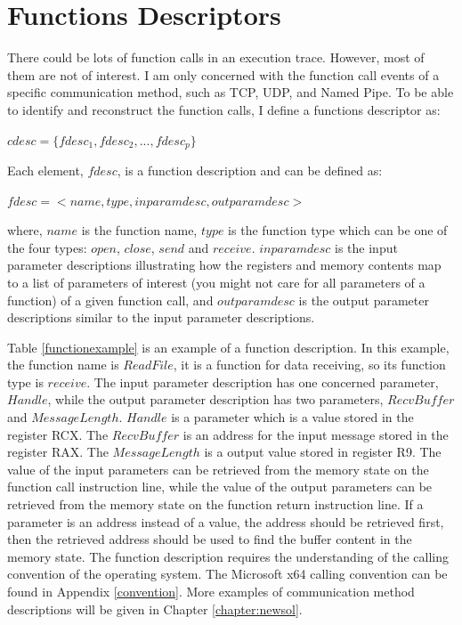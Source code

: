 \section{Functions Descriptors}\label{cdesc}
There could be lots of function calls in an execution trace. However, most of them are not of interest. I am only concerned with the function call events of a specific communication method, such as TCP, UDP, and Named Pipe. To be able to identify and reconstruct the function calls, I define a functions descriptor as:

$cdesc = \lbrace fdesc_1, fdesc_2,...,fdesc_p \rbrace$


Each element, $fdesc$, is a function description and can be defined as:

$fdesc = < name, type, inparamdesc, outparamdesc >$

where, $name$ is the function name, $type$ is the function type which can be one of the four types: $open$, $close$, $send$ and $receive$. $inparamdesc$ is the input parameter descriptions illustrating how the registers and memory contents map to a list of parameters of interest (you might not care for all parameters of a function) of a given function call, and $outparamdesc$ is the output parameter descriptions similar to the input parameter descriptions. 

Table \ref{functionexample} is an example of a function description. In this example, the function name is $ReadFile$, it is a function for data receiving, so its function type is $receive$. The input parameter description has one concerned parameter, $Handle$, while the output parameter description has two parameters, ${RecvBuffer}$ and $MessageLength$. $Handle$ is a parameter which is a value stored in the register RCX. The $RecvBuffer$ is an address for the input message stored in the register RAX. The $MessageLength$ is a output value stored in register R9. The value of the input parameters can be retrieved from the memory state on the function call instruction line, while the value of the output parameters can be retrieved from the memory state on the function return instruction line. If a parameter is an address instead of a value, the address should be retrieved first, then the retrieved address should be used to find the buffer content in the memory state. The function description requires the understanding of the calling convention of the operating system. The Microsoft x64 calling convention can be found in Appendix \ref{convention}. More examples of communication method descriptions will be given in Chapter \ref{chapter:newsol}.

